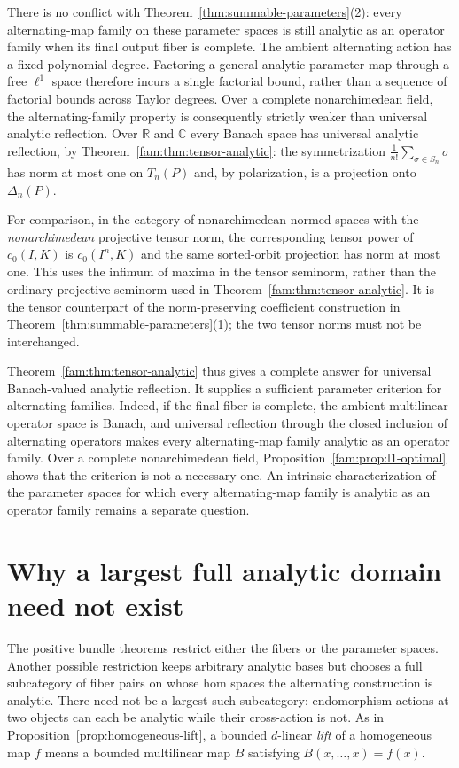 \documentclass[11pt]{amsart}
\theoremstyle{definition}
\theoremstyle{remark}
\numberwithin{equation}{section}
\begin{document}
There is no conflict with Theorem~\ref{thm:summable-parameters}(2): every alternating-map family on these
parameter spaces is still analytic as an operator family when its final output fiber is complete. The ambient alternating action
has a fixed polynomial degree. Factoring a general analytic parameter map through a free $\ell^1$ space
therefore incurs a single factorial bound, rather than a sequence of factorial bounds across Taylor degrees.
Over a complete nonarchimedean field, the alternating-family property is consequently strictly weaker
than universal analytic reflection. Over $\mathbb R$ and $\mathbb C$ every Banach space has universal analytic reflection, by Theorem~\ref{fam:thm:tensor-analytic}: the symmetrization $\frac1{n!}\sum_{\sigma\in S_n}\sigma$ has norm at most one on $T_n(P)$ and, by polarization, is a projection onto $\Delta_n(P)$.

For comparison, in the category of nonarchimedean normed spaces with the \emph{nonarchimedean} projective
tensor norm, the corresponding tensor power of $c_0(I,K)$ is $c_0(I^n,K)$ and the same sorted-orbit
projection has norm at most one. This uses the infimum of maxima in the tensor seminorm, rather than the
ordinary projective seminorm used in Theorem~\ref{fam:thm:tensor-analytic}.
It is the tensor counterpart of the norm-preserving coefficient construction in
Theorem~\ref{thm:summable-parameters}(1); the two tensor norms must not be interchanged.

Theorem~\ref{fam:thm:tensor-analytic} thus gives a complete answer for universal Banach-valued analytic
reflection. It supplies a sufficient parameter criterion for alternating families. Indeed, if the final
fiber is complete, the ambient multilinear operator space is Banach, and universal reflection through the
closed inclusion of alternating operators makes every alternating-map family analytic as an operator family.
Over a complete nonarchimedean field, Proposition~\ref{fam:prop:l1-optimal} shows that the criterion is not a necessary one.
An intrinsic characterization of the parameter spaces for which every alternating-map family is analytic
as an operator family
remains a separate question.


\section{Why a largest full analytic domain need not exist}\label{app:no-largest}\label{dom:section}\label{sec:domains}
The positive bundle theorems restrict either the fibers or the parameter spaces. Another possible
restriction keeps arbitrary analytic bases but chooses a full subcategory of fiber pairs on whose
hom spaces the alternating construction is analytic. There need not be a largest such subcategory:
endomorphism actions at two objects can each be analytic while their cross-action is not.
As in Proposition~\ref{prop:homogeneous-lift}, a bounded $d$-linear \emph{lift} of a
homogeneous map $f$ means a bounded multilinear map $B$ satisfying $B(x,\ldots,x)=f(x)$.
\end{document}
